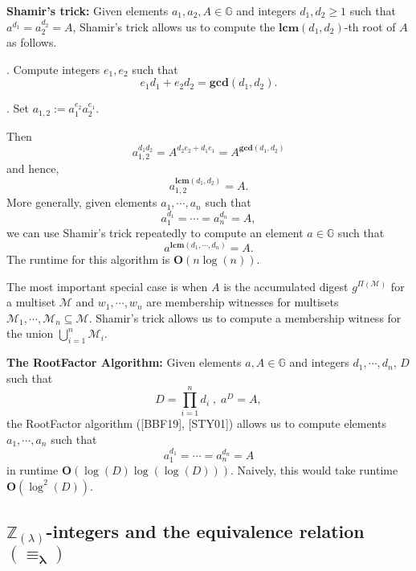 \documentclass[11pt, lettersize, notitlepage, leqno, footskip=0.6cm]{article}
\newcommand{\bz}{\mathbb Z}
\newcommand{\pl}{\prod\limits}
\newcommand{\slim}{\sum\limits}
\newcommand{\mc}{\mathcal}
\newcommand{\mb}{\mathbb}
\newcommand{\mbf}{\mathbf}
\newcommand{\lam}{\lambda}
\newcommand{\lamb}{\lambda}
\newcommand{\sub}{\subseteq}
\newcommand{\vs}{\vspace{-0.15cm}}
\newcommand{\op}{overwhelming probability}
\newcommand{\LCM}{\mbf{lcm}}
\newcommand{\GCD}{\mbf{gcd}}
\numberwithin{equation}{section}
\begin{document}
\noindent \textbf{Shamir's trick:} Given elements $a_1, a_2, A\in \mb{G}$ and integers $d_1, d_2\geq 1$ such that $a^{d_1} = a_2^{d_2} = A$, Shamir's trick allows us to compute the $\LCM(d_1, d_2)$-th root of $A$ as follows.

. Compute integers $e_1, e_2$ such that \vs $$e_1d_1+e_2d_2 = \GCD(d_1, d_2).$$

. Set $a_{1,2}:= a_1^{e_2}a_2^{e_1} $. 

\noindent Then \vspace{-0.15cm}$$a_{1,2}^{d_1d_2} = A^{d_2e_2 + d_1e_1} = A^{\GCD(d_1,d_2)}$$ and hence, \vspace{-0.15cm}$$a_{1,2}^{\LCM(d_1,d_2)} = A.$$ More generally, given elements $a_1,\cdots,a_n$ such that \vs $$a_1^{d_1} = \cdots = a_n^{d_n} = A, $$ we can use Shamir's trick repeatedly to compute an element $a\in\mb{G}$ such that \vs $$a^{\LCM(d_1,\cdots,d_n)} = A.$$ The runtime for this algorithm is $\mbf{O}(n\log(n))$.

The most important special case is when $A$ is the accumulated digest $g^{\Pi(\mc{M})}$ for a multiset $\mc{M}$ and $w_1,\cdots,w_n$ are membership witnesses for multisets $\mc{M}_1,\cdots,\mc{M}_n\sub \mc{M}$. Shamir's trick allows us to compute a membership witness for the union $\bigcup\limits_{i=1}^n \mc{M}_i$. 

\begin{comment} Conversely, for any element $b = \pl_{i=1}^n a_i^{x_i}$ $(x_i\in\bz)$, we have \vs $$ b^{\LCM(d_1,\cdots,d_n)} = A^{\slim_{i=1}^n  \frac{\LCM(d_1,\cdots,d_n)x_i}{d_i}} $$ and the low order assumption implies that with \op, \vs $$b =  a^{\slim_{i=1}^n  \frac{\LCM(d_1,\cdots,d_n)x_i}{d_i}}.$$ Thus, $b$ is expressible as a power of $a$. 

\end{comment}

\vspace{0.2cm}


\noindent \textbf{The RootFactor Algorithm:} Given elements $a, A\in\mb{G}$ and integers $d_1,\cdots, d_n$, $D$ such that \vs $$D= \pl_{i=1}^n d_i\; ,\; a^{D} = A,$$ the RootFactor algorithm ([BBF19], [STY01]) allows us to compute elements $a_1,\cdots, a_n$ such that \vs $$a_1^{d_1}=\cdots = a_n^{d_n} = A$$ in runtime $\mbf{O}(\log(D)\log(\log(D)))$. Naively, this would take runtime $\mbf{O}(\log^2(D))$.


\subsection{\fontsize{11}{11}\selectfont $\bz_{(\lamb)}$-integers and the equivalence relation $\mathbf{(\equiv_{\lam})}$}
\end{document}
